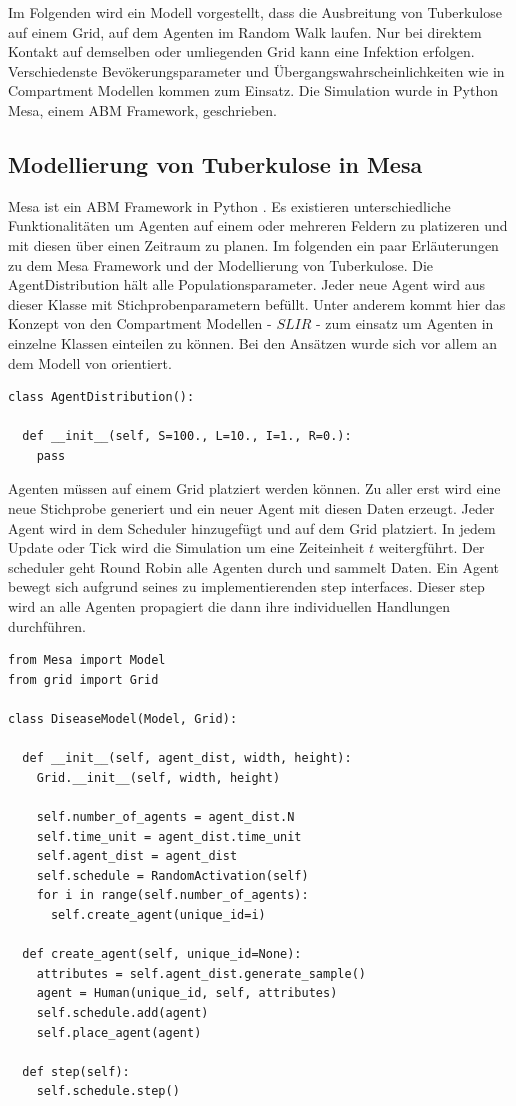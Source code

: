 \documentclass[paper=a4, fontsize=11pt, ngerman, abstract=on]{scrartcl}
\numberwithin{equation}{section} %
\numberwithin{figure}{section} %
\numberwithin{table}{section} %
\begin{document}
Im Folgenden wird ein Modell vorgestellt, dass die Ausbreitung von Tuberkulose auf einem Grid, auf dem Agenten im Random Walk laufen. Nur bei direktem Kontakt auf demselben oder umliegenden Grid kann eine Infektion erfolgen. Verschiedenste Bevökerungsparameter und Übergangswahrscheinlichkeiten wie in Compartment Modellen kommen zum Einsatz. Die Simulation wurde in Python Mesa, einem ABM Framework, geschrieben.

\subsection{Modellierung von Tuberkulose in Mesa}

Mesa ist ein ABM Framework in Python \cite{Mesa}. Es existieren unterschiedliche Funktionalitäten um Agenten auf einem oder mehreren Feldern zu platizeren und mit diesen über einen Zeitraum zu planen. Im folgenden ein paar Erläuterungen zu dem Mesa Framework und der Modellierung von Tuberkulose. Die AgentDistribution hält alle Populationsparameter. Jeder neue Agent wird aus dieser Klasse mit Stichprobenparametern befüllt. Unter anderem kommt hier das Konzept von den Compartment Modellen - $SLIR$ - zum einsatz um Agenten in einzelne Klassen einteilen zu können. Bei den Ansätzen wurde sich vor allem an dem Modell von \cite{Perez2009} orientiert.

\begin{lstlisting}[style=python]
class AgentDistribution():

  def __init__(self, S=100., L=10., I=1., R=0.):
    pass
\end{lstlisting}

Agenten müssen auf einem Grid platziert werden können. Zu aller erst wird eine neue Stichprobe generiert und ein neuer Agent mit diesen Daten erzeugt. Jeder Agent wird in dem Scheduler hinzugefügt und auf dem Grid platziert. In jedem Update oder Tick wird die Simulation um eine Zeiteinheit $t$ weitergführt. Der scheduler geht Round Robin alle Agenten  durch und sammelt Daten. Ein Agent bewegt sich aufgrund seines zu implementierenden step interfaces. Dieser step wird an alle Agenten propagiert die dann ihre individuellen Handlungen durchführen.

\begin{lstlisting}[style=python]
from Mesa import Model
from grid import Grid

class DiseaseModel(Model, Grid):

  def __init__(self, agent_dist, width, height):
    Grid.__init__(self, width, height)

    self.number_of_agents = agent_dist.N
    self.time_unit = agent_dist.time_unit
    self.agent_dist = agent_dist
    self.schedule = RandomActivation(self)
    for i in range(self.number_of_agents):
      self.create_agent(unique_id=i)

  def create_agent(self, unique_id=None):
    attributes = self.agent_dist.generate_sample()
    agent = Human(unique_id, self, attributes)
    self.schedule.add(agent)
    self.place_agent(agent)

  def step(self):
    self.schedule.step()
\end{lstlisting}
\end{document}
